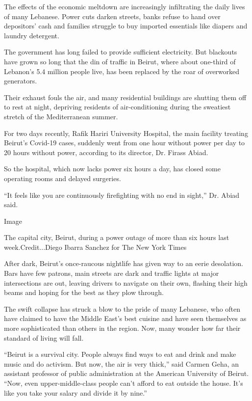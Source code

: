 The effects of the economic meltdown are increasingly infiltrating the
daily lives of many Lebanese. Power cuts darken streets, banks refuse to
hand over depositors' cash and families struggle to buy imported
essentials like diapers and laundry detergent.

The government has long failed to provide sufficient electricity. But
blackouts have grown so long that the din of traffic in Beirut, where
about one-third of Lebanon's 5.4 million people live, has been replaced
by the roar of overworked generators.

Their exhaust fouls the air, and many residential buildings are shutting
them off to rest at night, depriving residents of air-conditioning
during the sweatiest stretch of the Mediterranean summer.

For two days recently, Rafik Hariri University Hospital, the main
facility treating Beirut's Covid-19 cases, suddenly went from one hour
without power per day to 20 hours without power, according to its
director, Dr. Firass Abiad.

So the hospital, which now lacks power six hours a day, has closed some
operating rooms and delayed surgeries.

``It feels like you are continuously firefighting with no end in
sight,'' Dr. Abiad said.

Image

The capital city, Beirut, during a power outage of more than six hours
last~ week.Credit...Diego Ibarra Sanchez for The New York Times

After dark, Beirut's once-raucous nightlife has given way to an eerie
desolation. Bars have few patrons, main streets are dark and traffic
lights at major intersections are out, leaving drivers to navigate on
their own, flashing their high beams and hoping for the best as they
plow through.

The swift collapse has struck a blow to the pride of many Lebanese, who
often have claimed to have the Middle East's best cuisine and have seen
themselves as more sophisticated than others in the region. Now, many
wonder how far their standard of living will fall.

``Beirut is a survival city. People always find ways to eat and drink
and make music and do activism. But now, the air is very thick,'' said
Carmen Geha, an assistant professor of public administration at the
American University of Beirut. ``Now, even upper-middle-class people
can't afford to eat outside the house. It's like you take your salary
and divide it by nine.''

